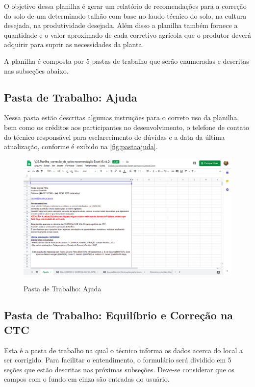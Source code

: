 O objetivo dessa planilha é gerar um relatório de recomendações para a correção do solo de um determinado talhão com base no laudo técnico do solo, na cultura desejada, na produtividade desejada. Além disso a planilha também fornece a quantidade e o valor aproximado de cada corretivo agrícola que o produtor deverá adquirir para suprir as necessidades da planta. 

A planilha é composta por 5 pastas de trabalho que serão enumeradas e descritas nas subseções abaixo.

\subsection{Pasta de Trabalho: Ajuda}
\label{subsec:pastaajuda}

Nessa pasta estão descritas algumas instruções para o correto uso da planilha, bem como os créditos aos participantes no desenvolvimento, o telefone de contato do técnico responsável para esclarecimento de dúvidas e a data da última atualização, conforme é exibido na \autoref{fig:pastaajuda}.

\begin{figure}[H]
    \centering
    \caption{Pasta de Trabalho: Ajuda}
    \includegraphics[width=13cm]{dados/figuras/planilha/tab-ajuda.png}
    \label{fig:pastaajuda}
\end{figure}

\subsection{Pasta de Trabalho: Equilíbrio e Correção na CTC}
\label{subsec:pastaequilibriocorrecaoctc}

Esta é a pasta de trabalho na qual o técnico informa os dados acerca do local a ser corrigido. Para facilitar o entendimento, o formulário será dividido em 5 seções que estão descritas nas próximas subseções. Deve-se considerar que os campos com o fundo em cinza são entradas do usuário.

